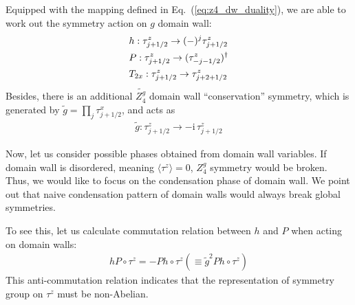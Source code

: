 \documentclass[reprint,amsmath,amssymb,aps,pra,]{revtex4-1}
\newcommand{\ii}{\mathrm{i}\,} %
\newcommand{\dg}{\dagger}
\begin{document}

Equipped with the mapping defined in Eq.~(\ref{eq:z4_dw_duality}), we are able to work out the symmetry action on $g$ domain wall:
\begin{align}
  &h:\tau^z_{j+1/2}\rightarrow (-)^j\tau^z_{j+1/2}\notag\\
  &P:\tau^z_{j+1/2}\rightarrow (\tau^z_{-j-1/2})^\dg\notag\\
  &T_{2x}:\tau^z_{j+1/2}\rightarrow \tau^z_{j+2+1/2}
  \label{eq:z4_dw_sym_action}
\end{align}
Besides, there is an additional $\widetilde{Z_4^g}$ domain wall ``conservation'' symmetry, which is generated by $\widetilde{g}=\prod_j\tau^x_{j+1/2}$, and acts as
\begin{align}
  \widetilde{g}: \tau^z_{j+1/2}\rightarrow-\ii\tau^z_{j+1/2}
  \label{}
\end{align}

Now, let us consider possible phases obtained from domain wall variables.
If domain wall is disordered, meaning $\langle\tau^z\rangle=0$, $Z_4^g$ symmetry would be broken.
Thus, we would like to focus on the condensation phase of domain wall.
We point out that naive condensation pattern of domain walls would always break global symmetries.

To see this, let us calculate commutation relation between $h$ and $P$ when acting on domain walls:
\begin{align}
  hP\circ\tau^z=-Ph\circ\tau^z(\equiv\widetilde{g}^2 Ph\circ\tau^z)
  \label{eq:dw_z4P_proj_rep}
\end{align}
This anti-commutation relation indicates that the representation of symmetry group on $\tau^z$ must be non-Abelian.
\end{document}
